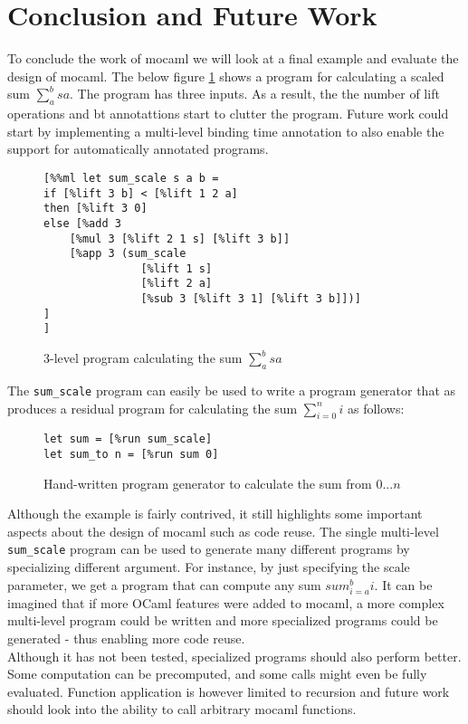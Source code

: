 
\section{Conclusion and Future Work}

To conclude the work of mocaml we will look at a final example and evaluate the design of mocaml. The below figure \ref{fig:scale-sum} shows a program for calculating a scaled sum $\sum_{a}^b sa$. The program has three inputs. As a result, the the number of lift operations and bt annotattions start to clutter the program. Future work could start by implementing a multi-level binding time annotation to also enable the support for automatically annotated programs.\\

\begin{figure}[H]
  \centering
\begin{verbatim}
[%%ml let sum_scale s a b =
if [%lift 3 b] < [%lift 1 2 a]
then [%lift 3 0]
else [%add 3
    [%mul 3 [%lift 2 1 s] [%lift 3 b]]
    [%app 3 (sum_scale
               [%lift 1 s]
               [%lift 2 a]
               [%sub 3 [%lift 3 1] [%lift 3 b]])]
]        
]
\end{verbatim}  
  \caption{3-level program calculating the sum $\sum_{a}^b sa$}
  \label{fig:scale-sum}
\end{figure}

The \texttt{sum\_scale} program can easily be used to write a program generator that as produces a residual program for calculating the sum $\sum_{i=0}^n i$ as follows:

\begin{figure}[H]
  \centering
\begin{verbatim}
let sum = [%run sum_scale]
let sum_to n = [%run sum 0]
\end{verbatim}  
  \caption{Hand-written program generator to calculate the sum from $0...n$}
  \label{fig:sum-res}
\end{figure}

Although the example is fairly contrived, it still highlights some important aspects about the design of mocaml such as code reuse. The single multi-level \texttt{sum\_scale} program can be used to generate many different programs by specializing different argument. For instance, by just specifying the scale parameter, we get a program that can compute any sum $sum_{i=a}^bi$. It can be imagined that if more OCaml features were added to mocaml, a more complex multi-level program could be written and more specialized programs could be generated - thus enabling more code reuse.\\
Although it has not been tested, specialized programs should also perform better. Some computation can be precomputed, and some calls might even be fully evaluated. Function application is however limited to recursion and future work should look into the ability to call arbitrary mocaml functions.\\

